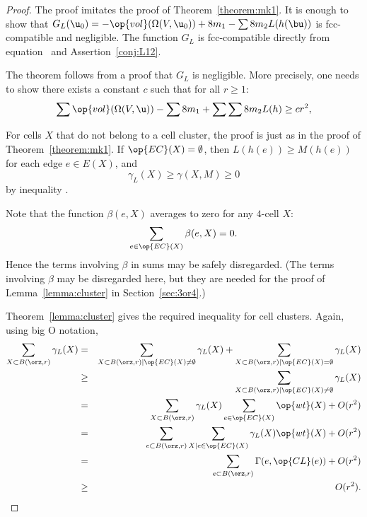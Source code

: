\begin{proof} The proof imitates the proof of
Theorem~\ref{theorem:mk1}.  It is enough to show that $G_L( \u_0) =
-\op{vol}(\Omega(V, \u_0)) + 8 m_1 - \sum 8 m_2 L(h(\bu))$ is
fcc-compatible and negligible.  The function $G_L$ is fcc-compatible
directly from equation~ and Assertion~\ref{conj:L12}.

The theorem follows from a proof that $G_L$ is negligible.  More
precisely, one needs to show there exists a constant $c$ such that
for all $r\ge 1$:%
\begin{equation}\label{eqn:A2neg}
\sum \op{vol}(\Omega(V, \u)) -\sum 8m_1 + \sum \sum 8 m_2 L(h) \ge c r^2,
\end{equation}

For cells $X$ that do not belong to a cell cluster,
the proof is just as in the proof of Theorem~\ref{theorem:mk1}.
If $\op{EC}(X)=\emptyset$, then 
$L(h(e))\ge M(h(e))$ for each edge $e\in E(X)$, and
\begin{displaymath}\gamma_L(X)\ge \gamma(X,M)\ge 0\end{displaymath} 
by inequality .

Note that the function $\beta(e,X)$ averages to zero for any $4$-cell $X$:
\begin{displaymath}
\sum_{e\in \op{EC}(X)} \beta(e,X) = 0.
\end{displaymath}
Hence the terms involving $\beta$ in sums may be safely disregarded.
(The terms involving $\beta$ may be disregarded here, but they are
needed for the proof of Lemma~\ref{lemma:cluster} in
Section~\ref{sec:3or4}.)

Theorem~\ref{lemma:cluster} gives the required inequality for cell
clusters.  Again, using big O notation,
\begin{eqnarray*}
\sum_{X\subset B(\orz,r)} \gamma_L(X) &=&
\sum_{X\subset B(\orz,r)\mid \op{EC}(X)\ne\emptyset} \gamma_L(X) +
\sum_{X\subset B(\orz,r)\mid \op{EC}(X)=\emptyset} \gamma_L(X) \vspace{6pt}\\
&\ge& \sum_{X\subset B(\orz,r)\mid \op{EC}(X)\ne\emptyset} \gamma_L(X)\vspace{6pt} \\
&=&\sum_{X\subset B(\orz,r)}\gamma_L(X)\sum_{e \in \op{EC}(X)}\op{wt}(X) + O(r^2)\vspace{6pt}\\
&=&\sum_{e\subset B(\orz,r)}\sum_{X\mid e \in \op{EC}(X)}\gamma_L(X)\op{wt}(X) + O(r^2)\vspace{6pt}\\
&=&\sum_{e\subset B(\orz,r)}\Gamma(e,\op{CL}(e)) + O(r^2)\vspace{6pt}\\
&\ge& ~~O(r^2).
\end{eqnarray*}



\end{proof}
